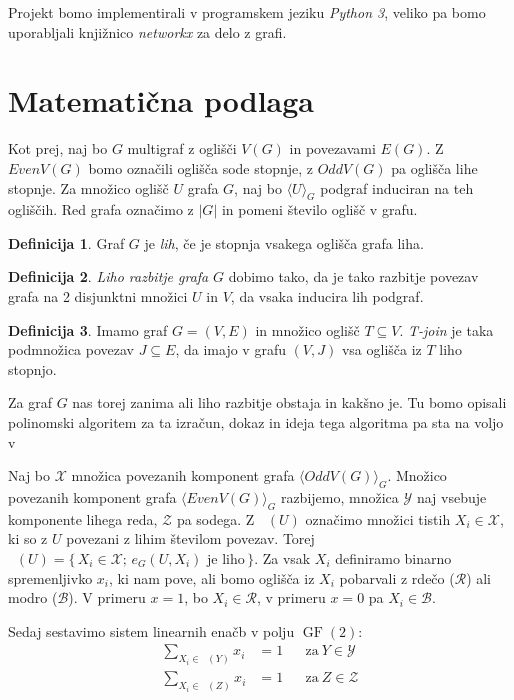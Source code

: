 \documentclass[12pt,a4paper]{amsart}
\theoremstyle{definition} %
\newtheorem{definicija}{Definicija}[section]
\theoremstyle{plain} %
\newcommand{\X}{\mathcal X}
\newcommand{\Y}{\mathcal Y}
\newcommand{\Z}{\mathcal Z}
\newcommand{\B}{\mathcal B}
\newcommand{\R}{\mathcal R}
\DeclareMathOperator{\GF}{GF}
\DeclareMathOperator{\NGG}{N_G}
\begin{document}
Projekt bomo implementirali v programskem jeziku \emph{Python 3}, veliko pa bomo uporabljali knjižnico \emph{networkx} za delo z grafi.

\section{Matematična podlaga}

Kot prej, naj bo $G$ multigraf z oglišči $V(G)$ in povezavami $E(G)$. Z $EvenV(G)$ bomo označili oglišča sode stopnje, z $OddV(G)$ pa oglišča lihe stopnje.
Za množico oglišč $U$ grafa $G$, naj bo $\langle U \rangle_G$ podgraf induciran na teh ogliščih. Red grafa označimo z $|G|$ in pomeni število oglišč v grafu.

\begin{definicija}
Graf $G$ je \emph{lih}, če je stopnja vsakega oglišča grafa liha.
\end{definicija}

\begin{definicija}
\emph{Liho razbitje grafa} $G$ dobimo tako, da je tako razbitje povezav grafa na 2 disjunktni množici $U$ in $V$, da vsaka inducira lih podgraf.
\end{definicija}

\begin{definicija}
Imamo graf $G = (V, E)$ in množico oglišč $T \subseteq V$. \emph{T-join} je taka podmnožica povezav $J \subseteq E$,
da imajo v grafu $(V, J)$ vsa oglišča iz $T$ liho stopnjo.
\end{definicija}

Za graf $G$ nas torej zanima ali liho razbitje obstaja in kakšno je.
Tu bomo opisali polinomski algoritem za ta izračun, dokaz in ideja tega algoritma pa sta na voljo v

Naj bo $\X$ množica povezanih komponent grafa $\langle OddV(G) \rangle_G$. Množico povezanih komponent grafa $\langle EvenV(G) \rangle_G$ razbijemo, množica $\Y$ naj vsebuje komponente lihega reda,
$\Z$ pa sodega.
Z $\NGG(U)$ označimo množici tistih $X_i \in \X$, ki so z $U$ povezani z lihim številom povezav.
Torej $\NGG(U)=\{\,X_i \in \X;\, e_G(U, X_i) \text{ je liho} \,\}$. Za vsak $X_i$ definiramo binarno spremenljivko $x_i$,
ki nam pove, ali bomo oglišča iz $X_i$ pobarvali z rdečo ($\R$) ali modro ($\B$).
V primeru $x=1$, bo $X_i \in \R$, v primeru $x=0$ pa $X_i \in \B$.

Sedaj sestavimo sistem linearnih enačb v polju $\GF(2)$:
\begin{align*}
\sum_{X_i \in \NGG(Y)} x_i &=1&   &\text{za}\ Y \in \Y\\
\sum_{X_i \in \NGG(Z)} x_i &=1&   &\text{za}\ Z \in \Z
\end{align*}
\end{document}
